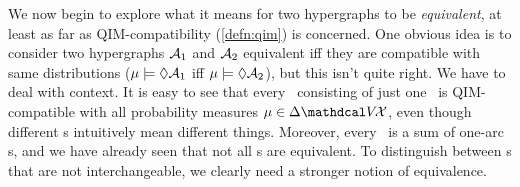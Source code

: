 We now begin to explore what it means for two hypergraphs to be \emph{equivalent},
    at least as far as QIM-compatibility (\cref{defn:qim}) is concerned.
One obvious idea is to consider two hypergraphs $\mathcal A_1$ and $\mathcal A_2$ equivalent iff they are compatible with same distributions ($\mu \models \Diamond\mathcal A_1$ iff $\mu \models \Diamond \mathcal A_2$),
    but this isn't quite right. 
We have to deal with context. 
It is easy to see that
    every \hgraph\ consisting of just one \arc\ is QIM-compatible with all probability measures $\mu \in \Delta \V\!\X$,
    even though different \arc s intuitively mean different things.
Moreover, every \hgraph\ is a sum of one-arc \hgraph s,
    and we have already seen that not all \hgraph s are equivalent.
%
To distinguish between \hgraph s that are not interchangeable,
    we clearly need a stronger notion of equivalence.
    
